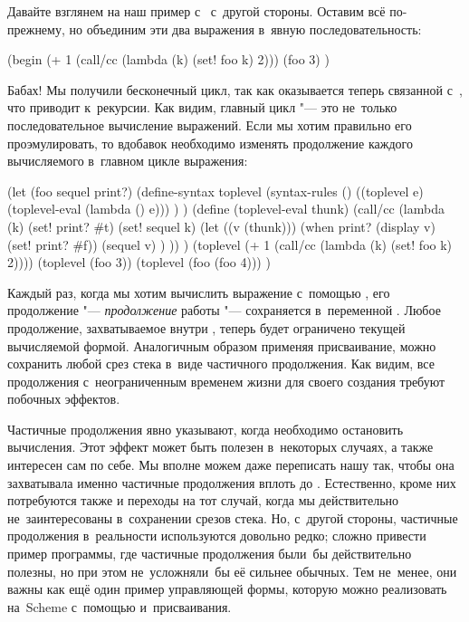 Давайте взглянем на наш пример с~ с~другой стороны. Оставим всё
по-прежнему, но объединим эти два выражения в~явную последовательность:

\begin{code:lisp}
(begin (+ 1 (call/cc (lambda (k) (set! foo k) 2)))
       (foo 3) )
\end{code:lisp}

Бабах! Мы получили бесконечный цикл, так как  оказывается теперь
связанной с~, что приводит к~рекурсии. Как видим,
главный цикл "--- это не~только последовательное вычисление выражений. Если мы
хотим правильно его проэмулировать, то вдобавок необходимо изменять продолжение
каждого вычисляемого в~главном цикле выражения:

\begin{code:lisp}
(let (foo sequel print?)
  (define-syntax toplevel
    (syntax-rules ()
      ((toplevel e) (toplevel-eval (lambda () e))) ) )
  (define (toplevel-eval thunk)
    (call/cc (lambda (k)
               (set! print? #t)
               (set! sequel k)
               (let ((v (thunk)))
                 (when print? (display v) (set! print? #f))
                 (sequel v) ) )) )
  (toplevel (+ 1 (call/cc (lambda (k) (set! foo k) 2))))
  (toplevel (foo 3))
  (toplevel (foo (foo 4))) )
\end{code:lisp}

Каждый раз, когда мы хотим вычислить выражение с~помощью , его
продолжение "--- \emph{продолжение} работы  "--- сохраняется
в~переменной . Любое продолжение, захватываемое внутри ,
теперь будет ограничено текущей вычисляемой формой. Аналогичным образом применяя
присваивание, можно сохранить любой срез стека в~виде частичного продолжения.
Как видим, все продолжения с~неограниченным временем жизни для своего создания
требуют побочных эффектов.

Частичные продолжения явно указывают, когда необходимо остановить вычисления.
Этот эффект может быть полезен в~некоторых случаях, а также интересен сам по
себе. Мы вполне можем даже переписать нашу  так, чтобы она
захватывала именно частичные продолжения вплоть до . Естественно,
кроме них потребуются также и переходы на тот случай, когда мы действительно
не~заинтересованы в~сохранении срезов стека. Но, с~другой стороны, частичные
продолжения в~реальности используются довольно редко; сложно привести пример
программы, где частичные продолжения были~бы действительно полезны, но при этом
не~усложняли~бы её сильнее обычных. Тем не~менее, они важны как ещё один пример
управляющей формы, которую можно реализовать на~Scheme с~помощью 
и~присваивания.


